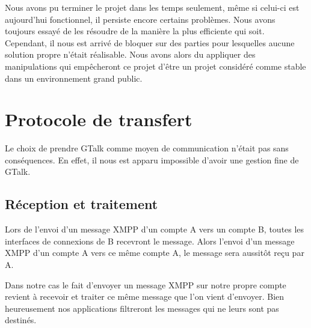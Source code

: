 Nous avons pu terminer le projet dans les temps seulement, même si celui-ci est aujourd'hui fonctionnel, il persiste encore certains problèmes. Nous avons toujours essayé de les
résoudre de la manière la plus efficiente qui soit. Cependant, il nous est arrivé de bloquer sur des
parties pour lesquelles aucune solution propre n'était réalisable. Nous avons alors du appliquer 
des manipulations qui empêcheront ce projet d'être un projet considéré comme stable dans un environnement
grand public.






\section{Protocole de transfert}

Le choix de prendre GTalk comme moyen de communication n'était pas sans conséquences.
En effet, il nous est apparu impossible d'avoir une gestion fine de GTalk.




\subsection{Réception et traitement}

Lors de l'envoi d'un message XMPP d'un compte A vers un compte B, toutes les interfaces de connexions de B recevront le message.
Alors l'envoi d'un message XMPP d'un compte A vers ce même compte A, le message sera aussitôt reçu par A.

Dans notre cas le fait d'envoyer un message XMPP sur notre propre compte revient à recevoir et traiter ce même message que l'on vient d'envoyer.
Bien heureusement nos applications filtreront les messages qui ne leurs sont pas destinés.

